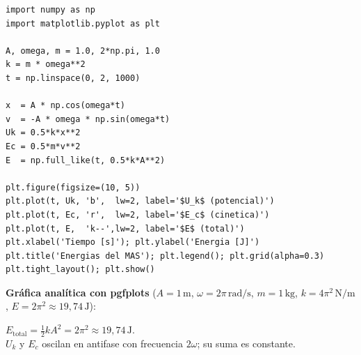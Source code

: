 \documentclass[12pt, a4paper, oneside]{book}
\begin{document}
\begin{solucion}
\begin{lstlisting}[caption={Gr\'aficas de energ\'ia MAS --- Problema 11}]
import numpy as np
import matplotlib.pyplot as plt

A, omega, m = 1.0, 2*np.pi, 1.0
k = m * omega**2
t = np.linspace(0, 2, 1000)

x  = A * np.cos(omega*t)
v  = -A * omega * np.sin(omega*t)
Uk = 0.5*k*x**2
Ec = 0.5*m*v**2
E  = np.full_like(t, 0.5*k*A**2)

plt.figure(figsize=(10, 5))
plt.plot(t, Uk, 'b',  lw=2, label='$U_k$ (potencial)')
plt.plot(t, Ec, 'r',  lw=2, label='$E_c$ (cinetica)')
plt.plot(t, E,  'k--',lw=2, label='$E$ (total)')
plt.xlabel('Tiempo [s]'); plt.ylabel('Energia [J]')
plt.title('Energias del MAS'); plt.legend(); plt.grid(alpha=0.3)
plt.tight_layout(); plt.show()
\end{lstlisting}

\medskip
\textbf{Gr\'afica anal\'itica con pgfplots} ($A=1\,\text{m}$, $\omega=2\pi\,\text{rad/s}$,
$m=1\,\text{kg}$, $k=4\pi^{2}\,\text{N/m}$, $E=2\pi^{2}\approx19{,}74\,\text{J}$):

\begin{center}
\end{center}

\begin{resultado}
$E_{\text{total}} = \tfrac{1}{2}kA^{2} = 2\pi^{2} \approx 19{,}74\,\text{J}$.\\
$U_k$ y $E_c$ oscilan en antifase con frecuencia $2\omega$; su suma es constante.
\end{resultado}
\end{solucion}
\end{document}

